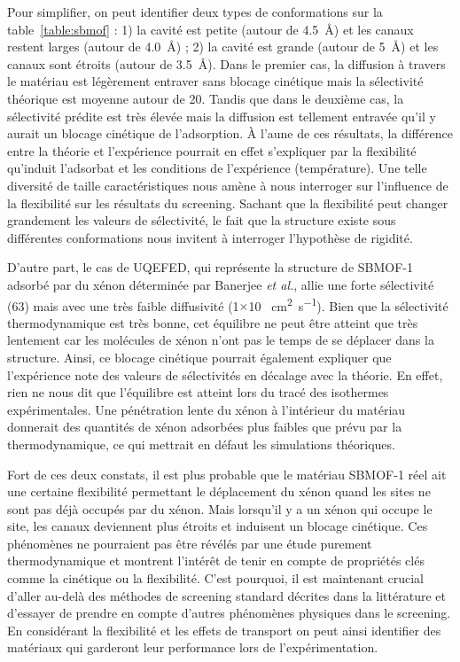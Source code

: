 \documentclass[main]{subfiles}
\begin{document}
Pour simplifier, on peut identifier deux types de conformations sur la table~\ref{table:sbmof} : 1) la cavité est petite (autour de \SI{4,5}{\angstrom}) et les canaux restent larges (autour de \SI{4,0}{\angstrom}) ; 2) la cavité est grande (autour de \SI{5}{\angstrom}) et les canaux sont étroits (autour de \SI{3,5}{\angstrom}). Dans le premier cas, la diffusion à travers le matériau est légèrement entraver sans blocage cinétique mais la sélectivité théorique est moyenne autour de 20. Tandis que dans le deuxième cas, la sélectivité prédite est très élevée mais la diffusion est tellement entravée qu'il y aurait un blocage cinétique de l'adsorption. \`A l'aune de ces résultats, la différence entre la théorie et l'expérience pourrait en effet s'expliquer par la flexibilité qu'induit l'adsorbat et les conditions de l'expérience (température). Une telle diversité de taille caractéristiques nous amène à nous interroger sur l'influence de la flexibilité sur les résultats du screening. Sachant que la flexibilité peut changer grandement les valeurs de sélectivité, le fait que la structure existe sous différentes conformations nous invitent à interroger l'hypothèse de rigidité.\autocite{Witman_2017} 

D'autre part, le cas de UQEFED, qui représente la structure de SBMOF-1 adsorbé par du xénon déterminée par Banerjee \emph{et al.},\autocite{Banerjee_2016} allie une forte sélectivité (63) mais avec une très faible diffusivité (1$\times$10 \SI{}{\square\centi\meter\per\second}). Bien que la sélectivité thermodynamique est très bonne, cet équilibre ne peut être atteint que très lentement car les molécules de xénon n'ont pas le temps de se déplacer dans la structure. Ainsi, ce blocage cinétique pourrait également expliquer que l'expérience note des valeurs de sélectivités en décalage avec la théorie. En effet, rien ne nous dit que l'équilibre est atteint lors du tracé des isothermes expérimentales. Une pénétration lente du xénon à l'intérieur du matériau donnerait des quantités de xénon adsorbées plus faibles que prévu par la thermodynamique, ce qui mettrait en défaut les simulations théoriques. 

Fort de ces deux constats, il est plus probable que le matériau SBMOF-1 réel ait une certaine flexibilité permettant le déplacement du xénon quand les sites ne sont pas déjà occupés par du xénon. Mais lorsqu'il y a un xénon qui occupe le site, les canaux deviennent plus étroits et induisent un blocage cinétique. Ces phénomènes ne pourraient pas être révélés par une étude purement thermodynamique et montrent l'intérêt de tenir en compte de propriétés clés comme la cinétique ou la flexibilité. C'est pourquoi, il est maintenant crucial d'aller au-delà des méthodes de screening standard décrites dans la littérature et d'essayer de prendre en compte d'autres phénomènes physiques dans le screening. En considérant la flexibilité et les effets de transport on peut ainsi identifier des matériaux qui garderont leur performance lors de l'expérimentation.
\end{document}
